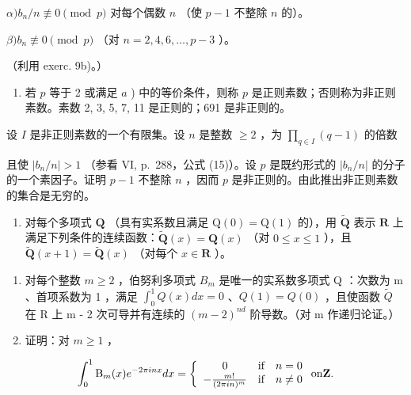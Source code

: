 \(\alpha) b_n / n \not\equiv 0 \pmod{p}\) 对每个偶数 \(n\) （使 \(p - 1\) 不整除 \(n\) 的）。

\(\beta) b_n \not\equiv 0 \pmod{p}\) （对 \(n = 2, 4, 6, \ldots, p - 3\) ）。

（利用 exerc. 9b)。）

\begin{enumerate}
\def\labelenumi{\alph{enumi})}
\setcounter{enumi}{1}
\tightlist
\item
  若 \(p\) 等于 2 或满足 \(a\) ) 中的等价条件，则称 \(p\) 是正则素数；否则称为非正则素数。素数 2, 3, 5, 7, 11 是正则的；691 是非正则的。
\end{enumerate}

设 \(I\) 是非正则素数的一个有限集。设 \(n\) 是整数 \(\geqslant 2\) ，为 \(\prod_{q \in I} (q - 1)\) 的倍数

且使 \(|b_n / n| > 1\) （参看 VI, p.~288，公式 (15)）。设 \(p\) 是既约形式的 \(|b_n / n|\) 的分子的一个素因子。证明 \(p - 1\) 不整除 \(n\) ，因而 \(p\) 是非正则的。由此推出非正则素数的集合是无穷的。

\begin{enumerate}
\def\labelenumi{\arabic{enumi})}
\setcounter{enumi}{11}
\tightlist
\item
  对每个多项式 \(\mathbf{Q}\) （具有实系数且满足 \(\mathrm{Q}(0) = \mathrm{Q}(1)\) 的），用 \(\tilde{\mathbf{Q}}\) 表示 \(\mathbf{R}\) 上满足下列条件的连续函数：\(\tilde{\mathbf{Q}}(x) = \mathbf{Q}(x)\) （对 \(0 \leqslant x \leqslant 1\) ），且 \(\tilde{\mathbf{Q}}(x + 1) = \tilde{\mathbf{Q}}(x)\) （对每个 \(x \in \mathbf{R}\) ）。
\end{enumerate}

\begin{enumerate}
\def\labelenumi{\alph{enumi})}
\item
  对每个整数 \(m \geqslant 2\) ，伯努利多项式 \(B_{m}\) 是唯一的实系数多项式 Q ：次数为 m 、首项系数为 1 ，满足 \(\int_{0}^{1} Q(x) dx = 0\) 、\(Q(1) = Q(0)\) ，且使函数 \(\tilde{Q}\) 在 R 上 m - 2 次可导并有连续的 \((m - 2)^{nd}\) 阶导数。（对 m 作递归论证。）
\item
  证明：对 \(m \geqslant 1\) ，
\end{enumerate}

\[
\int_ {0} ^ {1} \mathrm{B} _ {m} (x) e ^ {- 2 \pi i n x} d x = \left\{ \begin{array}{c c c} 0 & \text {if} & n = 0 \\ - \frac {m !}{(2 \pi i n) ^ {m}} & \text {if} & n \neq 0 \end{array} \right. \text {on} \mathbf {Z}.
\]

